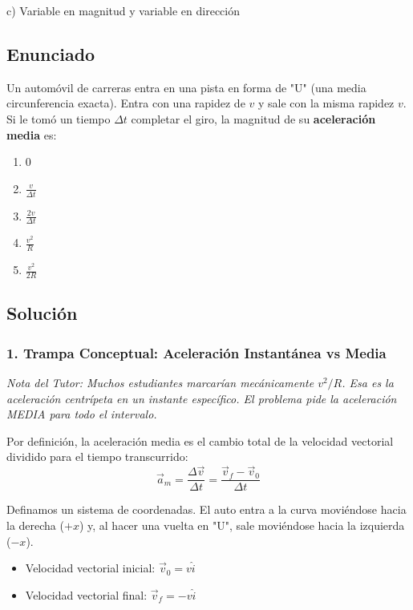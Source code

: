 \documentclass[12pt, a4paper]{article}
\begin{document}
\begin{tcolorbox}[colback=green!5!white, colframe=green!50!black, title=Respuesta Final]
\centering \Large c) Variable en magnitud y variable en dirección
\end{tcolorbox}

\newpage

\subsection*{Enunciado}
Un automóvil de carreras entra en una pista en forma de "U" (una media circunferencia exacta). Entra con una rapidez de $v$ y sale con la misma rapidez $v$. Si le tomó un tiempo $\Delta t$ completar el giro, la magnitud de su \textbf{aceleración media} es:
\begin{enumerate}[label=\alph*)]
    \item $0$
    \item $\frac{v}{\Delta t}$
    \item $\frac{2v}{\Delta t}$
    \item $\frac{v^2}{R}$
    \item $\frac{v^2}{2R}$
\end{enumerate}

\subsection*{Solución}

\subsubsection*{1. Trampa Conceptual: Aceleración Instantánea vs Media}
\textit{Nota del Tutor: Muchos estudiantes marcarían mecánicamente $v^2/R$. Esa es la aceleración centrípeta en un instante específico. El problema pide la aceleración MEDIA para todo el intervalo.}

Por definición, la aceleración media es el cambio total de la velocidad vectorial dividido para el tiempo transcurrido:
$$ \vec{a}_m = \frac{\Delta \vec{v}}{\Delta t} = \frac{\vec{v}_f - \vec{v}_0}{\Delta t} $$

Definamos un sistema de coordenadas. El auto entra a la curva moviéndose hacia la derecha ($+x$) y, al hacer una vuelta en "U", sale moviéndose hacia la izquierda ($-x$).
\begin{itemize}
    \item Velocidad vectorial inicial: $\vec{v}_0 = v\hat{i}$
    \item Velocidad vectorial final: $\vec{v}_f = -v\hat{i}$
\end{itemize}
\end{document}
